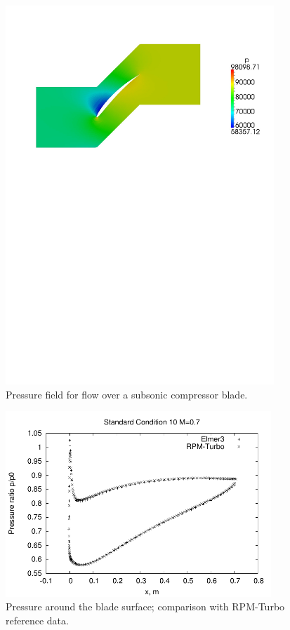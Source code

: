 \begin{figure}[htbp]
\begin{center}
\includegraphics[width=0.9\textwidth,viewport=24 495 570 817]{../2D/turbo_sc10/pressure-field.pdf}
\end{center}
\caption{Pressure field for flow over a subsonic compressor blade.}
\label{turbo-sc10-pressure-fig}
\end{figure}


\begin{figure}[htbp]
\begin{center}
\includegraphics[width=10cm]{../2D/turbo_sc10_parametric/surface_p.pdf}
\end{center}
\caption{Pressure around the blade surface; comparison with RPM-Turbo reference data.}
\label{turbo-sc10-surface-p-fig}
\end{figure}


